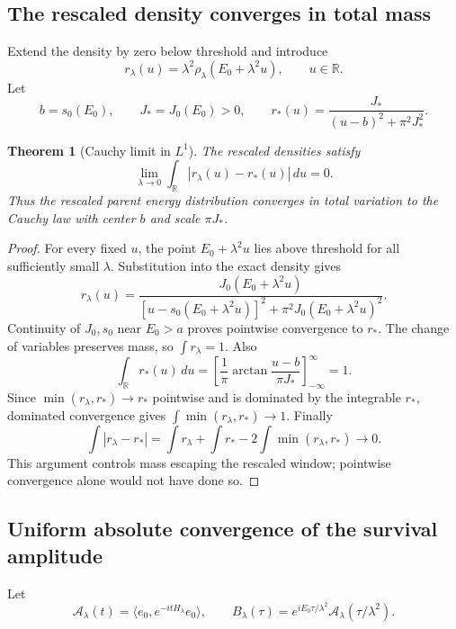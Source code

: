 \documentclass[11pt]{article}
\newtheorem{theorem}{Theorem}[section]
\theoremstyle{remark}
\begin{document}
\subsection{The rescaled density converges in total mass}

Extend the density by zero below threshold and introduce
\[
 r_\lambda(u)=\lambda^2\rho_\lambda(E_0+\lambda^2u),
 \qquad u\in\mathbb R.
\]
Let
\[
 b=s_0(E_0),\qquad J_*=J_0(E_0)>0,\qquad
 r_*(u)=\frac{J_*}{(u-b)^2+\pi^2J_*^2}.
\]

\begin{theorem}[Cauchy limit in \(L^1\)]
\label{thm:v20v51-L1}
The rescaled densities satisfy
\[
 \lim_{\lambda\to0}\int_{\mathbb R}
 |r_\lambda(u)-r_*(u)|\,du=0.
\]
Thus the rescaled parent energy distribution converges in total
variation to the Cauchy law with center \(b\) and scale \(\pi J_*\).
\end{theorem}
\begin{proof}
For every fixed \(u\), the point \(E_0+\lambda^2u\)
lies above threshold for all sufficiently small \(\lambda\).
Substitution into the exact density gives
\[
 r_\lambda(u)=
 \frac{J_0(E_0+\lambda^2u)}
 {[u-s_0(E_0+\lambda^2u)]^2+
     \pi^2J_0(E_0+\lambda^2u)^2}.
\]
Continuity of \(J_0,s_0\) near \(E_0>a\) proves
pointwise convergence to \(r_*\).
The change of variables preserves mass, so
\(\int r_\lambda=1\).  Also
\[
 \int_{\mathbb R}r_*(u)\,du
 =\left[\frac1\pi\arctan\frac{u-b}{\pi J_*}\right]_{-\infty}^\infty=1.
\]
Since \(\min(r_\lambda,r_*)\to r_*\) pointwise and is
dominated by the integrable \(r_*\), dominated convergence gives
\(\int\min(r_\lambda,r_*)\to1\).
Finally
\[
 \int|r_\lambda-r_*|
 =\int r_\lambda+\int r_*-2\int\min(r_\lambda,r_*)
 \longrightarrow0.
\]
This argument controls mass escaping the rescaled window;
pointwise convergence alone would not have done so.
\end{proof}

\subsection{Uniform absolute convergence of the survival amplitude}

Let
\[
 \mathcal A_\lambda(t)=
 \langle e_0,e^{-itH_\lambda}e_0\rangle,\qquad
 B_\lambda(\tau)=
 e^{iE_0\tau/\lambda^2}\mathcal A_\lambda(\tau/\lambda^2).
\]
\end{document}
